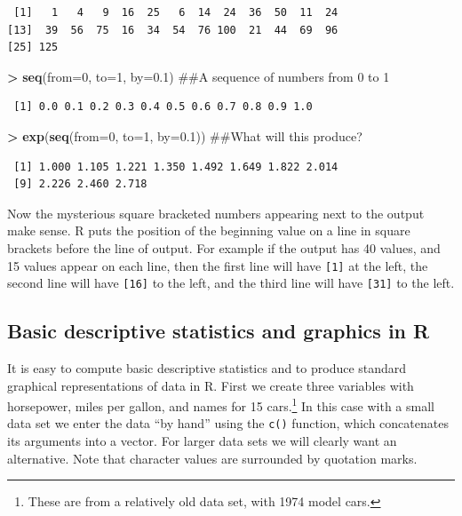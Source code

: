 \documentclass[]{krantz}
\makeatletter
\newenvironment{Shaded}{\begin{snugshade}}{\end{snugshade}}
\newcommand{\KeywordTok}[1]{\textcolor[rgb]{0.27,0.27,0.27}{\textbf{#1}}}
\newcommand{\DataTypeTok}[1]{\textcolor[rgb]{0.27,0.27,0.27}{#1}}
\newcommand{\DecValTok}[1]{\textcolor[rgb]{0.06,0.06,0.06}{#1}}
\newcommand{\FloatTok}[1]{\textcolor[rgb]{0.06,0.06,0.06}{#1}}
\newcommand{\StringTok}[1]{\textcolor[rgb]{0.5,0.5,0.5}{#1}}
\newcommand{\OperatorTok}[1]{\textcolor[rgb]{0.43,0.43,0.43}{\textbf{#1}}}
\newcommand{\NormalTok}[1]{#1}
\newenvironment{kframe}{%
\medskip{}
\setlength{\fboxsep}{.8em}
 \def\at@end@of@kframe{}%
 \ifinner\ifhmode%
  \def\at@end@of@kframe{\end{minipage}}%
  \begin{minipage}{\columnwidth}%
 \fi\fi%
 \def\FrameCommand##1{\hskip\@totalleftmargin \hskip-\fboxsep
 \colorbox{shadecolor}{##1}\hskip-\fboxsep
     \hskip-\linewidth \hskip-\@totalleftmargin \hskip\columnwidth}%
 \MakeFramed {\advance\hsize-\width
   \@totalleftmargin\z@ \linewidth\hsize
   \@setminipage}}%
 {\par\unskip\endMakeFramed%
 \at@end@of@kframe}
\renewenvironment{Shaded}{\begin{kframe}}{\end{kframe}}
\makeatother
\begin{document}
\begin{verbatim}
 [1]   1   4   9  16  25   6  14  24  36  50  11  24
[13]  39  56  75  16  34  54  76 100  21  44  69  96
[25] 125
\end{verbatim}

\begin{Shaded}
\begin{Highlighting}[]
\OperatorTok{>}\StringTok{ }\KeywordTok{seq}\NormalTok{(}\DataTypeTok{from=}\DecValTok{0}\NormalTok{, }\DataTypeTok{to=}\DecValTok{1}\NormalTok{, }\DataTypeTok{by=}\FloatTok{0.1}\NormalTok{) ##A sequence of numbers from 0 to 1}
\end{Highlighting}
\end{Shaded}

\begin{verbatim}
 [1] 0.0 0.1 0.2 0.3 0.4 0.5 0.6 0.7 0.8 0.9 1.0
\end{verbatim}

\begin{Shaded}
\begin{Highlighting}[]
\OperatorTok{>}\StringTok{ }\KeywordTok{exp}\NormalTok{(}\KeywordTok{seq}\NormalTok{(}\DataTypeTok{from=}\DecValTok{0}\NormalTok{, }\DataTypeTok{to=}\DecValTok{1}\NormalTok{, }\DataTypeTok{by=}\FloatTok{0.1}\NormalTok{)) ##What will this produce?}
\end{Highlighting}
\end{Shaded}

\begin{verbatim}
 [1] 1.000 1.105 1.221 1.350 1.492 1.649 1.822 2.014
 [9] 2.226 2.460 2.718
\end{verbatim}

Now the mysterious square bracketed numbers appearing next to the output
make sense. R puts the position of the beginning value on a line in
square brackets before the line of output. For example if the output has
40 values, and 15 values appear on each line, then the first line will
have \texttt{{[}1{]}} at the left, the second line will have
\texttt{{[}16{]}} to the left, and the third line will have
\texttt{{[}31{]}} to the left.

\subsection{Basic descriptive statistics and graphics in R}\label{dec}

It is easy to compute basic descriptive statistics and to produce
standard graphical representations of data in R. First we create three
variables with horsepower, miles per gallon, and names for 15
cars.\footnote{These are from a relatively old data set, with 1974 model
  cars.} In this case with a small data set we enter the data ``by
hand'' using the \texttt{c()} function, which concatenates its arguments
into a vector. For larger data sets we will clearly want an alternative.
Note that character values are surrounded by quotation marks.
\end{document}
